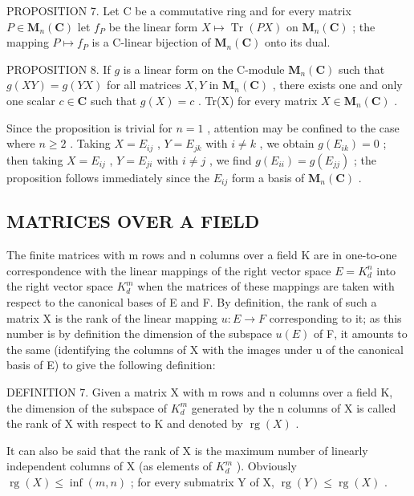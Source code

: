 PROPOSITION 7. Let C be a commutative ring and for every matrix \(P \in \mathbf{M}_n(\mathbf{C})\) let \(f_P\) be the linear form \(X \mapsto \operatorname{Tr}(PX)\) on \(\mathbf{M}_n(\mathbf{C})\) ; the mapping \(P \mapsto f_P\) is a C-linear bijection of \(\mathbf{M}_n(\mathbf{C})\) onto its dual.

PROPOSITION 8. If \(g\) is a linear form on the C-module \(\mathbf{M}_n(\mathbf{C})\) such that \(g(XY) = g(YX)\) for all matrices \(X, Y\) in \(\mathbf{M}_n(\mathbf{C})\) , there exists one and only one scalar \(c \in \mathbf{C}\) such that \(g(X) = c\) . Tr(X) for every matrix \(X \in \mathbf{M}_n(\mathbf{C})\) .

Since the proposition is trivial for \(n = 1\) , attention may be confined to the case where \(n \geqslant 2\) . Taking \(X = E_{ij}\) , \(Y = E_{jk}\) with \(i \neq k\) , we obtain \(g(E_{ik}) = 0\) ; then taking \(X = E_{ij}\) , \(Y = E_{ji}\) with \(i \neq j\) , we find \(g(E_{ii}) = g(E_{jj})\) ; the proposition follows immediately since the \(E_{ij}\) form a basis of \(\mathbf{M}_n(\mathbf{C})\) .

\subsection{MATRICES OVER A FIELD}

The finite matrices with m rows and n columns over a field K are in one-to-one correspondence with the linear mappings of the right vector space \(E = K_{d}^{n}\) into the right vector space \(K_{d}^{m}\) when the matrices of these mappings are taken with respect to the canonical bases of E and F. By definition, the rank of such a matrix X is the rank of the linear mapping \(u: E \to F\) corresponding to it; as this number is by definition the dimension of the subspace \(u(E)\) of F, it amounts to the same (identifying the columns of X with the images under u of the canonical basis of E) to give the following definition:

DEFINITION 7. Given a matrix X with m rows and n columns over a field K, the dimension of the subspace of \(K_{d}^{m}\) generated by the n columns of X is called the rank of X with respect to K and denoted by \(\operatorname{rg}(X)\) .

It can also be said that the rank of X is the maximum number of linearly independent columns of X (as elements of \(K_{d}^{m}\) ). Obviously \(\operatorname{rg}(X) \leqslant \inf(m, n)\) ; for every submatrix Y of X, \(\operatorname{rg}(Y) \leqslant \operatorname{rg}(X)\) .


